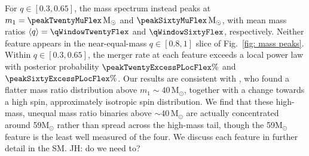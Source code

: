 \documentclass[%
    aps,
    prl,
    reprint,
    superscriptaddress,
    nolongbibliography,
    nobibnotes,
    nofootinbib,
    linenumbers,
    amsmath,amssymb,
]{revtex4-2}
\newcommand{\Msun}{\ensuremath{\mathrm{M}_{\odot}}}
\newcommand{\jh}[1]{{\color{orange}JH: #1}}
\newcommand{\featTen}{10\xspace}
\newcommand{\featTwenty}{21\xspace}
\newcommand{\featThirtyFive}{33\xspace}
\newcommand{\featSixty}{59\xspace}
\begin{document}
For $q \in [0.3, 0.65]$, the mass spectrum instead peaks at $m_1 = \peakTwentyMuFlex\,\Msun$ and $\peakSixtyMuFlex\,\Msun$, with mean mass ratios $\langle q \rangle = \qWindowTwentyFlex$ and $\qWindowSixtyFlex$, respectively. Neither feature appears in the near-equal-mass $q\in [0.8,1]$ slice of Fig.~\ref{fig: mass peaks}. Within $q \in [0.3, 0.65]$, the merger rate at each feature exceeds a local power law with posterior probability $\peakTwentyExcessPLocFlex\%$ and $\peakSixtyExcessPLocFlex\%$. %
Our results are consistent with \citet{LIGOScientific:2026ctl}, who found a flatter mass ratio distribution above $m_1 \sim 40\,\Msun$, together with a change towards a high spin, approximately isotropic spin distribution. We find that these high-mass, unequal mass ratio binaries above $\sim 40\,\Msun$ are actually concentrated around \featSixty $\Msun$ rather than spread across the high-mass tail, though the \featSixty $\Msun$ feature is the least well measured of the four. We discuss each feature in further detail in the SM. \jh{do we need to?}

\end{document}
